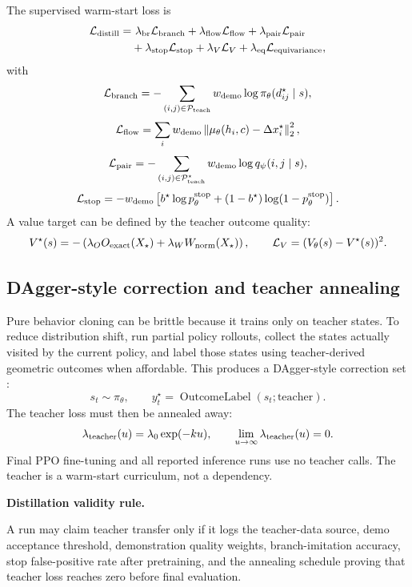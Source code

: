 \documentclass[11pt]{article}
\newcommand{\Pset}{\mathcal{P}}
\newcommand{\ExactOv}{O_{\rm exact}}
\newcommand{\WireNorm}{W_{\rm norm}}
\newcommand{\callout}[3]{%
\medskip\noindent\textbf{\textcolor{#1}{#2.}}\par\noindent #3\par\medskip
}
\begin{document}
The supervised warm-start loss is
\[
\begin{aligned}
    \mathcal L_{\rm distill}
    =&\ \lambda_{\rm br}\mathcal L_{\rm branch}
    +\lambda_{\rm flow}\mathcal L_{\rm flow}
    +\lambda_{\rm pair}\mathcal L_{\rm pair}\\
    &+\lambda_{\rm stop}\mathcal L_{\rm stop}
    +\lambda_V\mathcal L_V
    +\lambda_{\rm eq}\mathcal L_{\rm equivariance},
\end{aligned}
\]
with
\[
    \mathcal L_{\rm branch}
    =-\sum_{(i,j)\in\Pset_{\rm teach}}
    w_{\rm demo}\log \pi_\theta(d_{ij}^{\star}\mid s),
\]
\[
    \mathcal L_{\rm flow}
    =\sum_i w_{\rm demo}
    \left\|\mu_\theta(h_i,c)-\Delta x_i^{\star}\right\|_2^2,
\]
\[
    \mathcal L_{\rm pair}
    =-\sum_{(i,j)\in\Pset_{\rm teach}^{\star}}
    w_{\rm demo}\log q_\psi(i,j\mid s),
\]
\[
    \mathcal L_{\rm stop}
    =-w_{\rm demo}\left[b^{\star}\log p_\theta^{\rm stop}+(1-b^{\star})\log(1-p_\theta^{\rm stop})\right].
\]
A value target can be defined by the teacher outcome quality:
\[
    V^{\star}(s)=-\left(\lambda_O \ExactOv(X_\star)+\lambda_W\WireNorm(X_\star)\right),
    \qquad
    \mathcal L_V=(V_\theta(s)-V^{\star}(s))^2.
\]

\subsection{DAgger-style correction and teacher annealing}

Pure behavior cloning can be brittle because it trains only on teacher states. To reduce distribution shift, run partial policy rollouts, collect the states actually visited by the current policy, and label those states using teacher-derived geometric outcomes when affordable. This produces a DAgger-style correction set \cite{ross2011dagger}:
\[
    s_t\sim\pi_\theta,
    \qquad
    y_t^{\star}=\operatorname{OutcomeLabel}(s_t;\text{teacher}).
\]
The teacher loss must then be annealed away:
\[
    \lambda_{\rm teacher}(u)=\lambda_0\exp(-ku),
    \qquad
    \lim_{u\to\infty}\lambda_{\rm teacher}(u)=0.
\]
Final PPO fine-tuning and all reported inference runs use no teacher calls. The teacher is a warm-start curriculum, not a dependency.

\callout{green!70!black}{Distillation validity rule}{A run may claim teacher transfer only if it logs the teacher-data source, demo acceptance threshold, demonstration quality weights, branch-imitation accuracy, stop false-positive rate after pretraining, and the annealing schedule proving that teacher loss reaches zero before final evaluation.}
\end{document}
